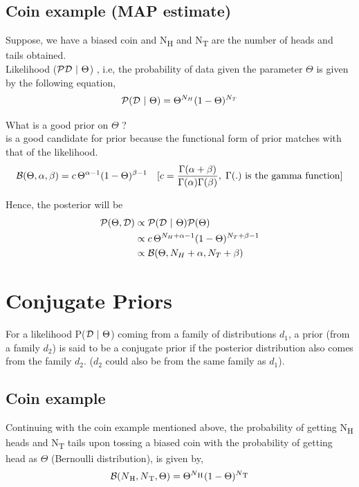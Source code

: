 \subsection{Coin example (MAP estimate)}

Suppose, we have a biased coin and N\textsubscript{H} and N\textsubscript{T} are the number of heads and tails obtained.\\ Likelihood ($\mathcal{P}\mathcal{D} \ | \  \Theta$) , i.e, the probability of data given the parameter $\Theta$ is given by the following equation,
$$
  \mathcal{P}(\mathcal{D} \ | \  \Theta)=\Theta^{N_H}(1-\Theta)^{N_T}
$$

What is a good prior on $\Theta$ ? \\
 is a good candidate for prior because the functional form of prior matches with that of the likelihood.
\begin{align*}
  \mathcal{B}(\Theta,\alpha,\beta) = c\,\Theta^{\alpha-1}(1-\Theta)^{\beta-1} &  & [c= \frac{\Gamma(\alpha + \beta)}{\Gamma(\alpha)\Gamma(\beta)},\; \Gamma(.) \text{ is the gamma function} ]
\end{align*}

Hence, the posterior will be
\begin{align*}
  \mathcal{P}(\Theta,\mathcal{D}) & \propto \mathcal{P}(\mathcal{D} \ | \  \Theta) \mathcal{P}(\Theta)                 \\
                 & \propto c\,\Theta^{N_H+\alpha-1}(1-\Theta)^{N_T+\beta-1} \\
                 & \propto \mathcal{B}(\Theta,N_H+\alpha,N_T+\beta)
\end{align*}

\section{Conjugate Priors}
For a likelihood P($\mathcal{D} \ | \  \Theta$) coming from a family of distributions $d_{1}$, a prior (from a family $d_{2}$) is said to be a conjugate prior if the posterior distribution also comes from the family $d_{2}$. ($d_{2}$ could also be from the same family as $d_{1}$).

\subsection{Coin example}
Continuing with the coin example mentioned above, the probability of getting N\textsubscript{H} heads and N\textsubscript{T} tails upon tossing a biased coin with the probability of getting head as $\Theta$ (Bernoulli distribution), is given by,
$$
  \mathcal{B}(N\textsubscript{H}, N\textsubscript{T}, \Theta) = \Theta^{N\textsubscript{H}}(1-\Theta)^{N\textsubscript{T}}
$$

